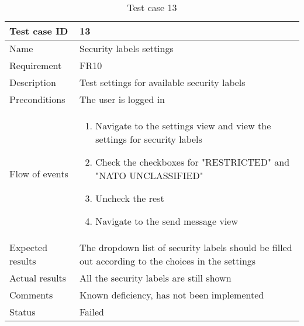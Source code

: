 		\begin{table}[htb]
			\begin{tabular}{l|p{10cm}}
				Test case ID & 13\\ \hline
				Name & Security labels settings\\ \hline
				Requirement & FR10\\ \hline
				Description & Test settings for available security labels\\ \hline
				Preconditions & The user is logged in\\ \hline
				Flow of events & 
					\begin{enumerate}
						\item{}Navigate to the settings view and view the settings for security labels
						\item{}Check the checkboxes for "RESTRICTED" and "NATO UNCLASSIFIED"
						\item{}Uncheck the rest
						\item{}Navigate to the send message view
					\end{enumerate} \\ \hline
				Expected results & The dropdown list of security labels should be filled out according to the choices in the settings \\ \hline
				Actual results &All the security labels are still shown\\ \hline
				Comments & Known deficiency, has not been implemented\\ \hline
				Status &Failed\\ \hline
			\end{tabular}
			\caption{Test case 13} \label{tab:case13}
		\end{table}

